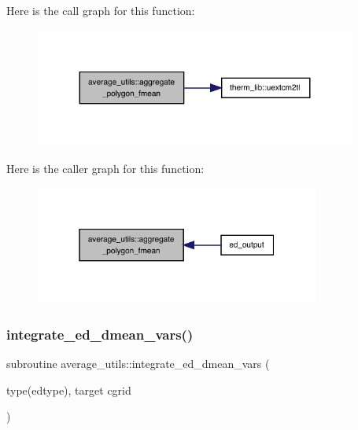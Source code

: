 Here is the call graph for this function\+:
\nopagebreak
\begin{figure}[H]
\begin{center}
\leavevmode
\includegraphics[width=299pt]{namespaceaverage__utils_a90965230835c19a82d90127089235c76_cgraph}
\end{center}
\end{figure}
Here is the caller graph for this function\+:
\nopagebreak
\begin{figure}[H]
\begin{center}
\leavevmode
\includegraphics[width=265pt]{namespaceaverage__utils_a90965230835c19a82d90127089235c76_icgraph}
\end{center}
\end{figure}
\mbox{\label{namespaceaverage__utils_a985b401d85dd857f44371dd2c3e7c40c}} 
\subsubsection{\texorpdfstring{integrate\+\_\+ed\+\_\+dmean\+\_\+vars()}{integrate\_ed\_dmean\_vars()}}
{\footnotesize\ttfamily subroutine average\+\_\+utils\+::integrate\+\_\+ed\+\_\+dmean\+\_\+vars (\begin{DoxyParamCaption}\item[{type(edtype), target}]{cgrid }\end{DoxyParamCaption})}

